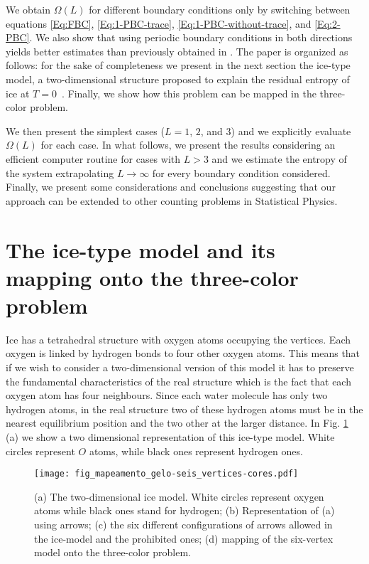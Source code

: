 \documentclass[3p, 10pt, onecolumn]{elsarticle}
\begin{document}
We obtain $\Omega(L)$ for different boundary conditions only by switching between
equations \ref{Eq:FBC}, \ref{Eq:1-PBC-trace}, \ref{Eq:1-PBC-without-trace},
and \ref{Eq:2-PBC}. We also show that using periodic boundary conditions in
both directions yields better estimates than previously obtained in \cite%
{rdasilvaEJP}. The paper is organized as follows: for the sake of
completeness we present in the next section the ice-type model, a
two-dimensional structure proposed to explain the residual entropy of ice at 
$T=0$~\cite{Pauling}. Finally, we show how this problem can be mapped in the
three-color problem.

We then present the simplest cases ($L=1$, $2$, and $3$) and we explicitly
evaluate $\Omega (L)$ for each case. In what follows, we present the results
considering an efficient computer routine for cases with $L>3$ and we
estimate the entropy of the system extrapolating $L\rightarrow \infty $ for
every boundary condition considered. Finally, we present some considerations
and conclusions suggesting that our approach can be extended to other
counting problems in Statistical Physics.

\section{The ice-type model and its mapping onto the three-color problem}

Ice has a tetrahedral structure with oxygen atoms occupying the vertices.
Each oxygen is linked by hydrogen bonds to four other oxygen atoms. This
means that if we wish to consider a two-dimensional version of this model it
has to preserve the fundamental characteristics of the real structure which
is the fact that each oxygen atom has four neighbours. Since each water
molecule has only two hydrogen atoms, in the real structure two of these
hydrogen atoms must be in the nearest equilibrium position and the two other
at the larger distance. In Fig. \ref{Fig:mapeamento_gelo-seis_vertices-cores}
(a) we show a two dimensional representation of this ice-type model. White
circles represent $O$ atoms, while black ones represent hydrogen ones.

\begin{figure}[tbp]
\begin{center}
\texttt{[image: fig\_mapeamento\_gelo-seis\_vertices-cores.pdf]}
\end{center}
\caption{(a) The two-dimensional ice model. White circles represent oxygen
atoms while black ones stand for hydrogen; (b) Representation of (a) using
arrows; (c) the six different configurations of arrows allowed in the
ice-model and the prohibited ones; (d) mapping of the six-vertex model onto
the three-color problem.}
\label{Fig:mapeamento_gelo-seis_vertices-cores}
\end{figure}
\end{document}
